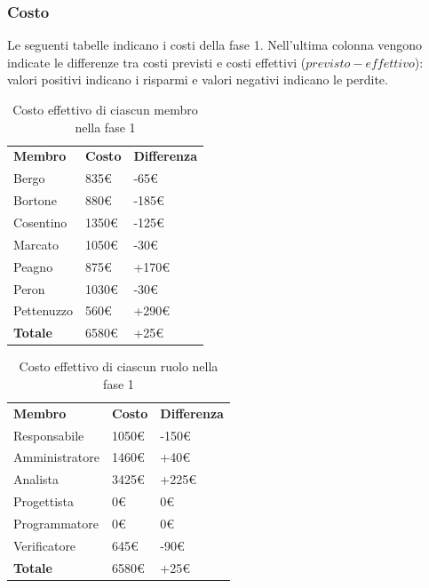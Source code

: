 	\subsubsection{Costo}
		Le seguenti tabelle indicano i costi della fase 1. Nell'ultima colonna vengono indicate le differenze tra costi previsti e costi effettivi ($previsto - effettivo$): valori positivi indicano i risparmi e valori negativi indicano le perdite.
		\begin{table}[h]
			\centering
		\begin{tabular}{| l | l | l |}
			\rowcolor{LightBlue}
			\textbf{\color{white}Membro}
			& \textbf{\color{white}Costo}
			& \textbf{\color{white}Differenza}\\
			
			Bergo 				& 835€ 	& -65€\\
			Bortone 			& 880€ 	& -185€\\
			Cosentino 		& 1350€ 	& -125€\\
			Marcato 			& 1050€ 	& -30€\\
			Peagno 			& 875€ 	& +170€\\
			Peron 				& 1030€ 	& -30€\\
			Pettenuzzo 	& 560€ 	& +290€\\ \hline
			\textbf{Totale} & 6580€ & +25€\\ \hline
		\end{tabular}
		\caption{Costo effettivo di ciascun membro nella fase 1}	
	\end{table}
	\begin{table}[h]
		\centering
		\begin{tabular}{| l | l |l|}
			\rowcolor{LightBlue}
			\textbf{\color{white}Membro}
			& \textbf{\color{white}Costo}
			& \textbf{\color{white}Differenza}\\

			Responsabile 		& 1050€ 	& -150€\\
			Amministratore 	& 1460€ 	& +40€\\
			Analista 				& 3425€ 	& +225€\\
			Progettista 			& 0€ 		& 0€\\
			Programmatore 		& 0€ 		& 0€\\
			Verificatore 		& 645€ 	& -90€\\ \hline
			\textbf{Totale} 	& 6580€ 	& +25€\\ \hline
		\end{tabular}
		\caption{Costo effettivo di ciascun ruolo nella fase 1}
	\end{table}
	\newpage
